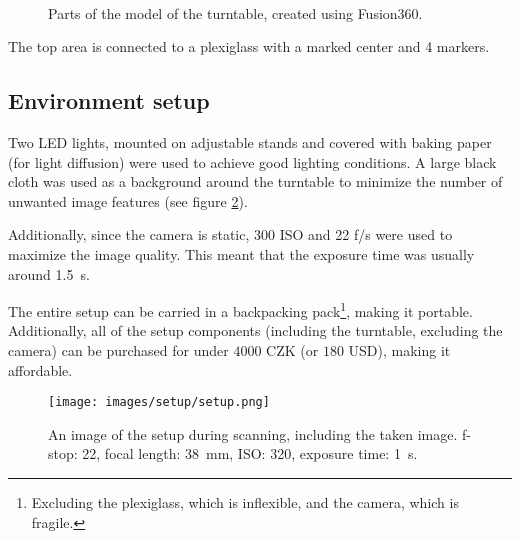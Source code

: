 \begin{figure}
	\centering
	\hfill
	\hfill
	\\
	\qquad
	\qquad
	\hfill
	\hfill
	\qquad
	\qquad
	\quad
	\qquad
	\caption{Parts of the model of the turntable, created using Fusion360.}%
	\label{fig:turntable}
\end{figure}

The top area is connected to a plexiglass with a marked center and 4 markers.

\subsection{Environment setup}
Two LED lights, mounted on adjustable stands and covered with baking paper (for light diffusion) were used to achieve good lighting conditions.
A large black cloth was used as a background around the turntable to minimize the number of unwanted image features (see figure \ref{fig:setup}).

Additionally, since the camera is static, 300 ISO and 22 f/s were used to maximize the image quality.
This meant that the exposure time was usually around \SI{1.5}{\second}.

The entire setup can be carried in a backpacking pack\footnote{Excluding the plexiglass, which is inflexible, and the camera, which is fragile.}, making it portable.
Additionally, all of the setup components (including the turntable, excluding the camera) can be purchased for under $4000$ CZK (or $180$ USD), making it affordable.

\begin{figure}
	\centering
	\texttt{[image: images/setup/setup.png]}
	\caption{An image of the setup during scanning, including the taken image. f-stop: 22, focal length: \SI{38}{\milli\meter}, ISO: 320, exposure time: \SI{1}{\second}.}
	  
	\label{fig:setup}
\end{figure}

